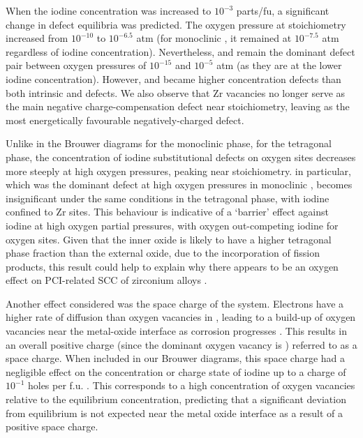 When the iodine concentration was increased to $10^{-3}$ parts/fu, a significant change in defect equilibria was predicted. The oxygen pressure at stoichiometry increased from $10^{-10}$ to $10^{-6.5}$ atm (for monoclinic \zirconia, it remained at $10^{-7.5}$ atm regardless of iodine concentration). Nevertheless,  and  remain the dominant defect pair between oxygen pressures of $10^{-15}$ and $10^{-5}$ atm (as they are at the lower iodine concentration). However,  and  became higher concentration defects than both intrinsic  and  defects. We also observe that Zr vacancies no longer serve as the main negative charge-compensation defect near stoichiometry, leaving  as the most energetically favourable negatively-charged defect.  

Unlike in the Brouwer diagrams for the monoclinic phase, for the tetragonal phase, the concentration of iodine substitutional defects on oxygen sites decreases more steeply at high oxygen pressures, peaking near stoichiometry.  in particular, which was the dominant defect at high oxygen pressures in monoclinic \zirconia , becomes insignificant under the same conditions in the tetragonal phase, with iodine confined to Zr sites. This behaviour is indicative of a `barrier' effect against iodine at high oxygen partial pressures, with oxygen out-competing iodine for oxygen sites. Given that the inner oxide is likely to have a higher tetragonal phase fraction than the external oxide, due to the incorporation of fission products, this result could help to explain why there appears to be an oxygen effect on PCI-related SCC of zirconium alloys \cite{hofmann1984stress}. 

Another effect considered was the space charge of the system. Electrons have a higher rate of diffusion than oxygen vacancies in \zirconia , leading to a build-up of oxygen vacancies near the metal-oxide interface as corrosion progresses \cite{bojinov2010influence}. This results in an overall positive charge (since the dominant oxygen vacancy is ) referred to as a space charge. When included in our Brouwer diagrams, this space charge had a negligible effect on the concentration or charge state of iodine up to a charge of $10^{-1}$ holes per f.u. \zirconia . This corresponds to a high concentration of oxygen vacancies relative to the equilibrium concentration, predicting that a significant deviation from equilibrium is not expected near the metal oxide interface as a result of a positive space charge.

